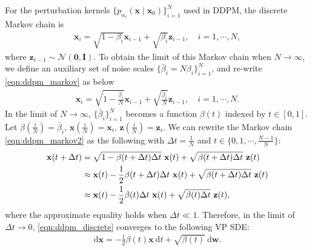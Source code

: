 \documentclass{article} \usepackage{iclr2021_conference,times}
\newcommand{\ud}{\mathrm{d}}
\newcommand{\mcal}{\mathcal}
\newcommand{\bfx}{\mathbf{x}}
\newcommand{\bfw}{\mathbf{w}}
\newcommand{\bfz}{\mathbf{z}}
\newcommand{\bfI}{\mathbf{I}}
\newcommand{\bfzero}{\mathbf{0}}
\newcommand{\bbeta}{\bar{\beta}}
\begin{document}
For the perturbation kernels $\{p_{\alpha_i}(\bfx \mid \bfx_0)\}_{i=1}^N$ used in DDPM, the discrete Markov chain is
\begin{align}
    \bfx_i = \sqrt{1-\beta_{i}} \bfx_{i-1} + \sqrt{\beta_{i}} \bfz_{i-1}, \quad i=1,\cdots,N, \label{eqn:ddpm_markov}
\end{align}
where $\bfz_{i-1} \sim \mcal{N}(\bfzero, \bfI)$. To obtain the limit of this Markov chain when $N\to\infty$, we define an auxiliary set of noise scales $\{\bbeta_i = N \beta_i\}_{i=1}^N$, and re-write \cref{eqn:ddpm_markov} as below
\begin{align}
    \bfx_i = \sqrt{1-\frac{\bbeta_{i}}{N}} \bfx_{i-1} + \sqrt{\frac{\bbeta_{i}}{N}} \bfz_{i-1}, \quad i=1,\cdots,N. \label{eqn:ddpm_markov2}
\end{align}
In the limit of $N\to \infty$, $\{\bbeta_i\}_{i=1}^N$ becomes a function $\beta(t)$ indexed by $t \in [0, 1]$. Let $\beta\left(\frac{i}{N}\right) = \bbeta_i$, $\bfx(\frac{i}{N}) = \bfx_i$, $\bfz(\frac{i}{N}) = \bfz_i$. We can rewrite the Markov chain \cref{eqn:ddpm_markov2} as the following with $\Delta t = \frac{1}{N}$ and $t \in \{0, 1, \cdots, \frac{N-1}{N}\}$:
\begin{align}
\bfx(t + \Delta t) &= \sqrt{1 - \beta(t + \Delta t)\Delta t} ~\bfx(t) + \sqrt{\beta(t + \Delta t)\Delta t}~ \bfz(t) \notag\\
&\approx \bfx(t) -\frac{1}{2}\beta(t + \Delta t)\Delta t~\bfx(t) + \sqrt{\beta(t+\Delta t)\Delta t}~\bfz(t) \notag\\
&\approx \bfx(t) -\frac{1}{2}\beta(t)\Delta t~\bfx(t) + \sqrt{\beta(t)\Delta t}~ \bfz(t), \label{eqn:ddpm_discrete}
\end{align}
where the approximate equality holds when $\Delta t \ll 1$.
Therefore, in the limit of $\Delta t \to 0$, \cref{eqn:ddpm_discrete} converges to the following VP SDE:
\begin{align}
\ud \bfx = -\frac{1}{2}\beta(t) \bfx~ \ud t + \sqrt{\beta(t)} ~\ud \bfw.
\end{align}
\end{document}
